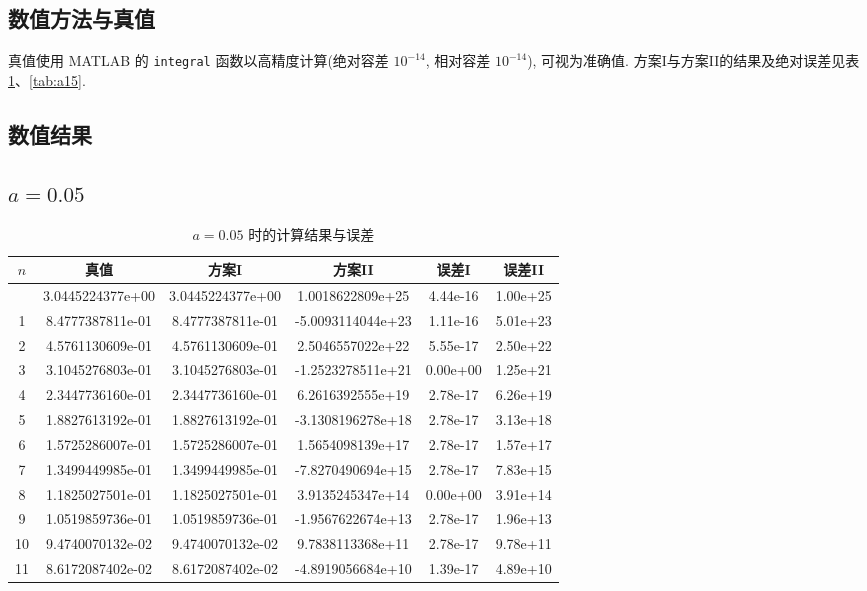 \documentclass[12pt,a4paper]{ctexart}
\begin{document}
\subsection{数值方法与真值}
真值使用 MATLAB 的 \texttt{integral} 函数以高精度计算(绝对容差 $10^{-14}$, 相对容差 $10^{-14}$), 可视为准确值. 方案I与方案II的结果及绝对误差见表\ref{tab:a005}、\ref{tab:a15}. 

\subsection{数值结果}

\subsection*{$a=0.05$}
\begin{longtable}{cccccc}
\caption{$a=0.05$ 时的计算结果与误差}\label{tab:a005}\\
\toprule
$n$ & 真值 & 方案I & 方案II & 误差I & 误差II \\
\midrule
\endfirsthead
\bottomrule
\endfoot
0  & 3.0445224377e+00 & 3.0445224377e+00 & 1.0018622809e+25 & 4.44e-16 & 1.00e+25 \\
1  & 8.4777387811e-01 & 8.4777387811e-01 & -5.0093114044e+23 & 1.11e-16 & 5.01e+23 \\
2  & 4.5761130609e-01 & 4.5761130609e-01 &  2.5046557022e+22 & 5.55e-17 & 2.50e+22 \\
3  & 3.1045276803e-01 & 3.1045276803e-01 & -1.2523278511e+21 & 0.00e+00 & 1.25e+21 \\
4  & 2.3447736160e-01 & 2.3447736160e-01 &  6.2616392555e+19 & 2.78e-17 & 6.26e+19 \\
5  & 1.8827613192e-01 & 1.8827613192e-01 & -3.1308196278e+18 & 2.78e-17 & 3.13e+18 \\
6  & 1.5725286007e-01 & 1.5725286007e-01 &  1.5654098139e+17 & 2.78e-17 & 1.57e+17 \\
7  & 1.3499449985e-01 & 1.3499449985e-01 & -7.8270490694e+15 & 2.78e-17 & 7.83e+15 \\
8  & 1.1825027501e-01 & 1.1825027501e-01 &  3.9135245347e+14 & 0.00e+00 & 3.91e+14 \\
9  & 1.0519859736e-01 & 1.0519859736e-01 & -1.9567622674e+13 & 2.78e-17 & 1.96e+13 \\
10 & 9.4740070132e-02 & 9.4740070132e-02 &  9.7838113368e+11 & 2.78e-17 & 9.78e+11 \\
11 & 8.6172087402e-02 & 8.6172087402e-02 & -4.8919056684e+10 & 1.39e-17 & 4.89e+10 \\

\end{longtable}
\end{document}
